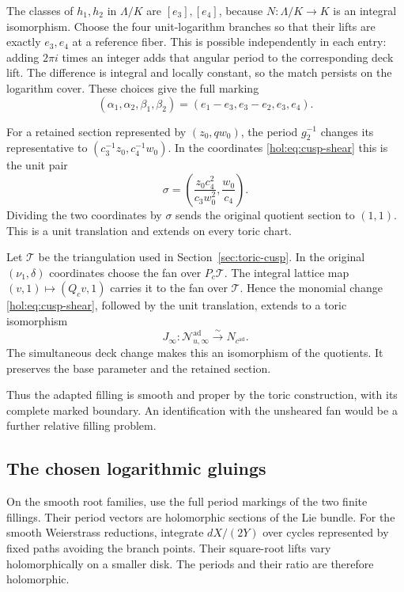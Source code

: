 \documentclass[11pt]{article}
\numberwithin{equation}{section}
\begin{document}
The classes of $h_1,h_2$ in $\Lambda/K$ are $[e_3],[e_4]$, because
$N:\Lambda/K\to K$ is an integral isomorphism. Choose the four
unit-logarithm branches so that their lifts are exactly $e_3,e_4$
at a reference fiber. This is possible independently in each entry:
adding $2\pi i$ times an integer adds that angular period to the
corresponding deck lift. The difference is integral and locally
constant, so the match persists on the logarithm cover. These choices
give the full marking
\[
 (\alpha_1,\alpha_2,\beta_1,\beta_2)
       =(e_1-e_3,e_3-e_2,e_3,e_4).
\]

For a retained section represented by $(z_0,qw_0)$, the period
$g_2^{-1}$ changes its representative to
$(c_3^{-1}z_0,c_4^{-1}w_0)$. In the coordinates
\eqref{hol:eq:cusp-shear} this is the unit pair
\[
 \sigma=\left(\frac{z_0c_4^2}{c_3w_0^2},\frac{w_0}{c_4}\right).
\]
Dividing the two coordinates by $\sigma$ sends the original quotient
section to $(1,1)$. This is a unit translation and extends on every
toric chart.

Let $\mathcal T$ be the triangulation used in
Section~\ref{sec:toric-cusp}. In the original $(\nu_1,\delta)$
coordinates choose the fan over $P_c\mathcal T$. The integral
lattice map $(v,1)\mapsto(Q_cv,1)$ carries it to the fan over
$\mathcal T$. Hence the monomial change
\eqref{hol:eq:cusp-shear}, followed by the unit translation, extends
to a toric isomorphism
\begin{equation}\label{hol:eq:cusp-isomorphism}
 J_\infty:\mathcal N^{\mathrm{ad}}_{u,\infty}
             \xrightarrow{\ \sim\ }N_{c^{\mathrm{ad}}}.
\end{equation}
The simultaneous deck change makes this an isomorphism of the
quotients. It preserves the base parameter and the retained section.

Thus the adapted filling is smooth and proper by the toric
construction, with its complete marked boundary. An identification
with the unsheared fan would be a further relative filling problem.

\subsection{The chosen logarithmic gluings}

On the smooth root families, use the full period markings of the
two finite fillings. Their period vectors are holomorphic sections
of the Lie bundle. For the smooth Weierstrass reductions, integrate
$dX/(2Y)$ over cycles represented by fixed paths avoiding the branch
points. Their square-root lifts vary holomorphically on a smaller
disk. The periods and their ratio are therefore holomorphic.
\end{document}
